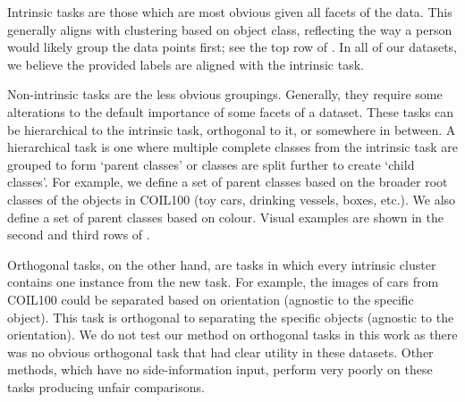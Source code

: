 \documentclass[../thesis.tex]{subfiles}
\begin{document}
Intrinsic tasks are those which are most obvious given all facets of the data. This generally aligns with clustering based on object class, reflecting the way a person would likely group the data points first; see the top row of . 
In all of our datasets, we believe the provided labels are aligned with the intrinsic task.

Non-intrinsic tasks are the less obvious groupings. Generally, they require some alterations to the default importance of some facets of a dataset. These tasks can be hierarchical to the intrinsic task, orthogonal to it, or somewhere in between. A hierarchical task is one where multiple complete classes from the intrinsic task are grouped to form `parent classes' or classes are split further to create `child classes'. For example, we define a set of parent classes based on the broader root classes of the objects in COIL100 (toy cars, drinking vessels, boxes, etc.).
We also define a set of parent classes based on colour. 
Visual examples are shown in the second and third rows of . 

Orthogonal tasks, on the other hand, are tasks in which every intrinsic cluster contains one instance from the new task. For example, the images of cars from COIL100 could be separated based on orientation (agnostic to the specific object).
This task is orthogonal to separating the specific objects (agnostic to the orientation). 
We do not test our method on orthogonal tasks in this work as there was no obvious orthogonal task that had clear utility in these datasets. 
Other methods, which have no side-information input, perform very poorly on these tasks producing unfair comparisons.
\end{document}
